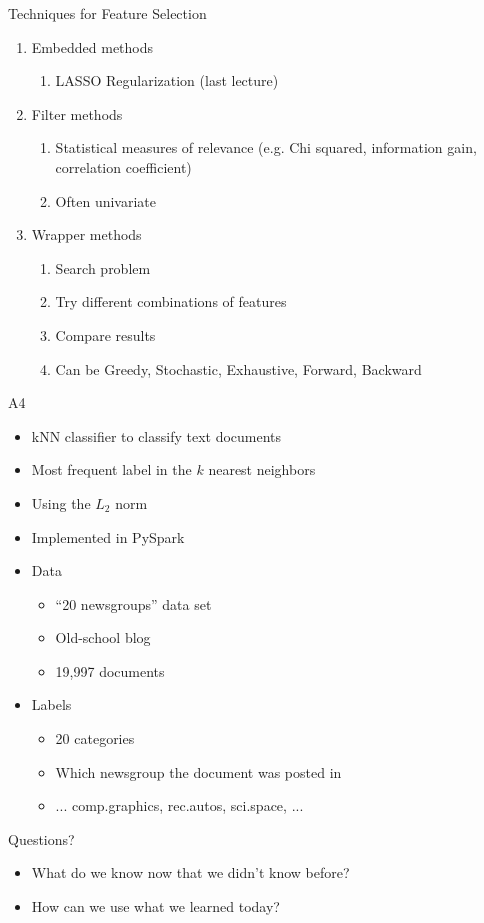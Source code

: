 \documentclass[aspectratio=169]{beamer}
\begin{document}
\begin{frame}{Techniques for Feature Selection}

\begin{enumerate}
\item Embedded methods
	\begin{enumerate}
	\item LASSO Regularization (last lecture)
	\end{enumerate}
\item Filter methods
	\begin{enumerate}
	\item Statistical measures of relevance (e.g. Chi squared, information gain, correlation coefficient)
	\item Often univariate 
	\end{enumerate}
\item Wrapper methods
	\begin{enumerate}
	\item Search problem
	\item Try different combinations of features
	\item Compare results
	\item Can be Greedy, Stochastic, Exhaustive, Forward, Backward
	\end{enumerate}
\end{enumerate}
\end{frame}

\begin{frame}{A4}

\begin{itemize}
\item kNN classifier to classify text documents
\item Most frequent label in the $k$ nearest neighbors
\item Using the $L_2$ norm
\item Implemented in PySpark
\item Data
\begin{itemize}
\item ``20 newsgroups'' data set
\item Old-school blog
\item 19,997 documents
\end{itemize}
\item Labels
\begin{itemize}
\item 20 categories
\item Which newsgroup the document was posted in
\item ... comp.graphics, rec.autos, sci.space, ...
\end{itemize}
\end{itemize}
\end{frame}

\begin{frame}{Questions?}
\begin{itemize}
	\item What do we know now that we didn't know before?

	\item How can we use what we learned today?
\end{itemize}
\end{frame}
\end{document}
